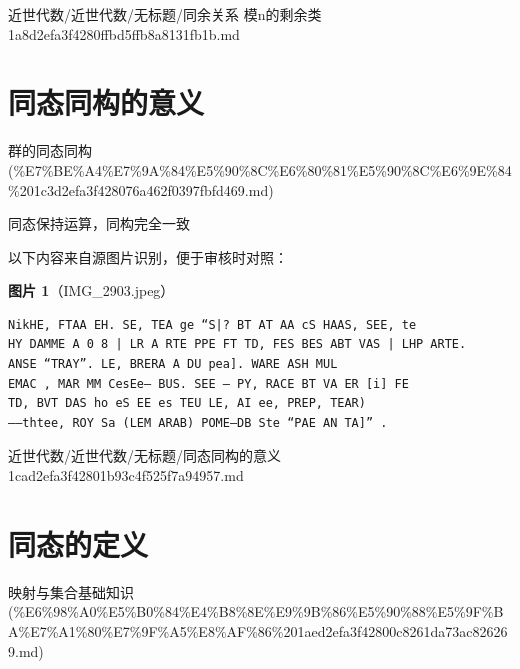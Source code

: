 \begin{note}[来源路径]

近世代数/近世代数/无标题/同余关系 模n的剩余类 1a8d2efa3f4280ffbd5ffb8a8131fb1b.md

\end{note}

\section*{同态同构的意义}

\begin{note}[来源上级主题]

群的同态同构 (\%E7\%BE\%A4\%E7\%9A\%84\%E5\%90\%8C\%E6\%80\%81\%E5\%90\%8C\%E6\%9E\%84\%201c3d2efa3f428076a462f0397fbfd469.md)

\end{note}

\begin{note}[同态同构的意义]

同态保持运算，同构完全一致

\end{note}

\begin{note}
以下内容来自源图片识别，便于审核时对照：

\textbf{图片 1}（IMG\_2903.jpeg）
\begin{Verbatim}[fontsize=\small]
NikHE, FTAA EH. SE, TEA ge “S|? BT AT AA cS HAAS, SEE, te
HY DAMME A 0 8 | LR A RTE PPE FT TD, FES BES ABT VAS | LHP ARTE.
ANSE “TRAY”. LE, BRERA A DU pea]. WARE ASH MUL
EMAC , MAR MM CesEe— BUS. SEE — PY, RACE BT VA ER [i] FE
TD, BVT DAS ho eS EE es TEU LE, AI ee, PREP, TEAR)
——thtee, ROY Sa (LEM ARAB) POME—DB Ste “PAE AN TA]” .
\end{Verbatim}

\end{note}

\begin{note}[来源路径]

近世代数/近世代数/无标题/同态同构的意义 1cad2efa3f42801b93c4f525f7a94957.md

\end{note}

\section*{同态的定义}

\begin{note}[来源上级主题]

映射与集合基础知识 (\%E6\%98\%A0\%E5\%B0\%84\%E4\%B8\%8E\%E9\%9B\%86\%E5\%90\%88\%E5\%9F\%BA\%E7\%A1\%80\%E7\%9F\%A5\%E8\%AF\%86\%201aed2efa3f42800c8261da73ac826269.md)

\end{note}

